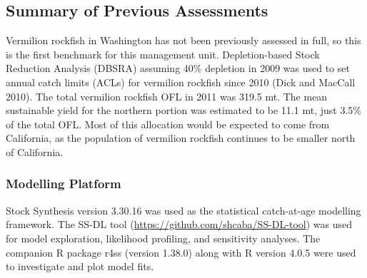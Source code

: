 \documentclass[11pt,
  english,
  a4paper,
]{article}
\begin{document}
\leavevmode\tagmcend\tagstructend


\hypertarget{summary-of-previous-assessments}{%
\subsection{Summary of Previous Assessments}\label{summary-of-previous-assessments}}

\leavevmode\tagmcend\tagstructend


Vermilion rockfish in Washington has not been previously assessed in full, so this is the first benchmark for this management unit. Depletion-based Stock Reduction Analysis (DBSRA) assuming 40\% depletion in 2009 was used to set annual catch limits (ACLs) for vermilion rockfish since 2010 {(Dick and MacCall 2010)\leavevmode\tagmcend\tagstructend}. The total vermilion rockfish OFL in 2011 was 319.5 mt. The mean sustainable yield for the northern portion was estimated to be 11.1 mt, just 3.5\% of the total OFL. Most of this allocation would be expected to come from California, as the population of vermilion rockfish continues to be smaller north of California.

\leavevmode\tagmcend\tagstructend\par


\hypertarget{modelling-platform}{%
\subsubsection{Modelling Platform}\label{modelling-platform}}

\leavevmode\tagmcend\tagstructend


Stock Synthesis version 3.30.16 was used as the statistical catch-at-age modelling framework. The SS-DL tool ({\url{https://github.com/shcaba/SS-DL-tool}\leavevmode\tagmcend\tagstructend}) was used for model exploration, likelihood profiling, and sensitivity analyses. The companion R package r4ss (version 1.38.0) along with R version 4.0.5 were used to investigate and plot model fits.

\leavevmode\tagmcend\tagstructend\par
\end{document}
